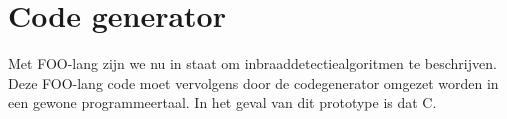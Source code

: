 
\section{Code generator}
\label{section:devel-codegen}

Met FOO-lang zijn we nu in staat om inbraaddetectiealgoritmen te beschrijven.
Deze FOO-lang code moet vervolgens door de codegenerator omgezet worden in een
gewone programmeertaal. In het geval van dit prototype is dat C.






